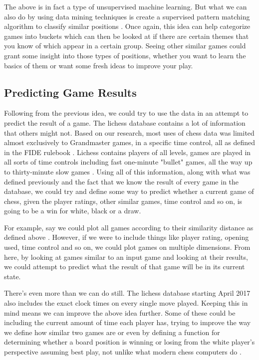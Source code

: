 \documentclass[12pt]{article}
\begin{document}
    The above is in fact a type of unsupervised machine learning. But what we can also do by using data mining techniques is create a supervised pattern matching algorithm to classify similar positions \cite{main}\cite{association}. Once again, this idea can help categorize games into buckets which can then be looked at if there are certain themes that you know of which appear in a certain group. Seeing other similar games could grant some insight into those types of positions, whether you want to learn the basics of them or want some fresh ideas to improve your play.

    \subsection{Predicting Game Results}

    Following from the previous idea, we could try to use the data in an attempt to predict the result of a game. The lichess database contains a lot of information that others might not. Based on our research, most uses of chess data was limited almost exclusively to Grandmaster games, in a specific time control, all as defined in the FIDE rulebook \cite{fiderules}. Lichess contains players of all levels, games are played in all sorts of time controls including fast one-minute "bullet" games, all the way up to thirty-minute slow games \cite{lichessdb}. Using all of this information, along with what was defined previously and the fact that we know the result of every game in the database, we could try and define some way to predict whether a current game of chess, given the player ratings, other similar games, time control and so on, is going to be a win for white, black or a draw.

    For example, say we could plot all games according to their similarity distance as defined above \cite{main}. However, if we were to include things like player rating, opening used, time control and so on, we could plot games on multiple dimensions. From here, by looking at games similar to an input game and looking at their results, we could attempt to predict what the result of that game will be in its current state.

    There's even more than we can do still. The lichess database starting April 2017 also includes the exact clock times on every single move played. Keeping this in mind means we can improve the above idea further. Some of these could be including the current amount of time each player has, trying to improve the way we define how similar two games are or even by defining a function for determining whether a board position is winning or losing from the white player's perspective assuming best play, not unlike what modern chess computers do \cite{stockfish}. 
\end{document}
